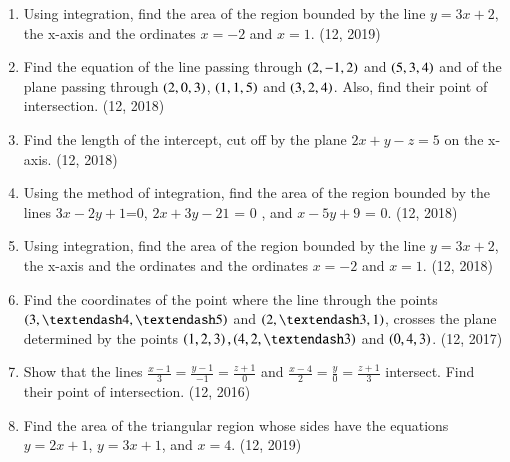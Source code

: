 \begin{enumerate}[label=\thesubsection.\arabic*, ref=\thesubsection.\theenumi]
\item Using integration, find the area of the region bounded by the line $y = 3x + 2,$ the x-axis and the ordinates $x = - 2$ and $x = 1$. \hfill (12, 2019)
\item Find the equation of the line passing through $\left(2,-1, 2\right)$ and $\left(5, 3, 4\right)$ and of the plane passing through $\left(2, 0, 3\right)$, $\left(1, 1, 5\right)$ and $\left(3, 2, 4\right)$. Also, find their point of intersection. \hfill (12, 2018)
\item Find the length of the intercept, cut off by the plane $2x+y-z=5$ on the x-axis. \hfill (12, 2018)
\item Using the method of integration, find the area of the region bounded by the lines $3x-2y+1$=$0$, $2x+3y-21$ = $0$ , and  $x-5y+9$ = $0$. \hfill (12, 2018)
\item Using integration, find the area of the region bounded by the line $y = 3x + 2$, the x-axis and the ordinates and the ordinates $x=-2$ and $x=1$. \hfill (12, 2018)
\item Find the coordinates of the point where the line through the points $\brak{3, – 4, – 5}$ and $\brak{2, – 3, 1}$, crosses the plane determined by the points $\brak{1, 2, 3}, \brak{4, 2, – 3}$ and $\left(0, 4, 3\right)$. \hfill (12, 2017)
\item Show that the lines $\frac{x-1}{3} = \frac{y-1}{-1} = \frac{z+1}{0} $ and $\frac{x-4}{2} = \frac{y}{0} = \frac{z+1}{3} $ intersect. Find their point of intersection. \hfill (12, 2016)
	\item Find the area of the triangular region whose sides have the equations $y = 2x + 1$, $y = 3x + 1$, and $x = 4$. \hfill (12, 2019)
\end{enumerate}
